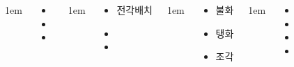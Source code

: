 \documentclass[20pt, a0paper, landscape]{tikzposter}
\begin{document}
\begin{columns}
{\begin{LARGE}
\begin{itemize}
					\end{itemize}
				\end{LARGE}
			} %


			{
					\setlength{\leftmargini}{4em}
					\setlength{\labelsep} {1em}
				\begin{LARGE}
					\begin{itemize}
					\item 
					\item 
					\item 
					\end{itemize}
				\end{LARGE}
			} %



			{
					\setlength{\leftmargini}{4em}
					\setlength{\labelsep} {1em}
				\begin{LARGE}
					\begin{itemize}
					\item 전각배치
					\item 
					\item 
					\end{itemize}
				\end{LARGE}
			} %


			{
					\setlength{\leftmargini}{4em}
					\setlength{\labelsep} {1em}
				\begin{LARGE}
					\begin{itemize}
					\item 불화
					\item 탱화
					\item 조각 
					\end{itemize}
				\end{LARGE}
			} %





			{
					\setlength{\leftmargini}{4em}
					\setlength{\labelsep} {1em}
				\begin{LARGE}
					\begin{itemize}
					\item 
					\item 
					\item 
					\item 
					\end{itemize}
				\end{LARGE}
			}


\end{columns}
\end{document}
